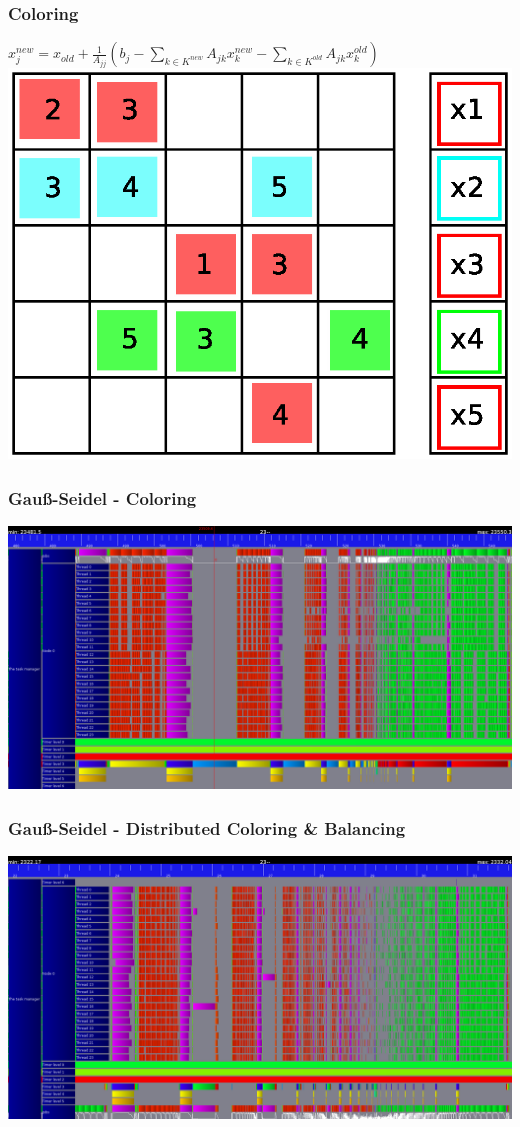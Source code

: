 \documentclass{beamer}
\begin{document}
\begin{frame}
\frametitle{Coloring}
$ x_j^{new} = x_{old} + \frac{1}{A_{jj}} \left(b_{j} - \sum_{k \in K^{new}}A_{jk}
 x_k^{new} - \sum_{k \in K^{old}}A_{jk} x_k^{old}\right)$
\includegraphics[width=0.8\linewidth]{graphic/coloringGS14.eps}
\end{frame}

\begin{frame}
\frametitle{Gau\ss-Seidel - Coloring}
\includegraphics[width=1\linewidth]{undistributed_coloring_gs.png}
\end{frame}

\begin{frame}
\frametitle{Gau\ss-Seidel - Distributed Coloring \& Balancing}
\includegraphics[width=1\linewidth]{one_iteration.png}
\end{frame}
\end{document}
